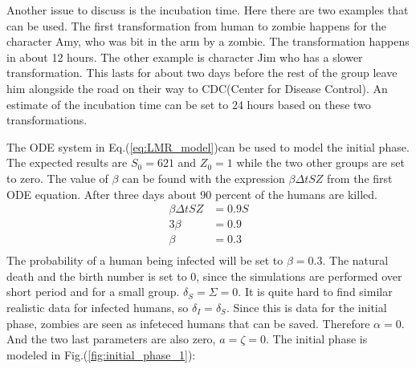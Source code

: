 \documentclass[%
twoside,                 %
final,                   %
chapterprefix=true,      %
open=right               %
10pt]{book}
\begin{document}
\vspace{3mm}




\vspace{3mm}


Another issue to discuss is the incubation time. Here there are two examples that can be used. The first transformation from human to zombie happens for the character Amy, who was bit in the arm by a zombie. The transformation happens in about 12 hours. The other example is character Jim who has a slower transformation. This lasts for about two days before the rest of the group leave him alongside the road on their way to CDC(Center for Disease Control). An estimate of the incubation time can be set to 24 hours based on these two transformations.


\vspace{3mm}




\vspace{3mm}


The ODE system in Eq.(\ref{eq:LMR_model})can be used to model the initial phase. The expected results are $S_0 = 621$ and $Z_0 = 1$ while the two other groups are set to zero. The value of $\beta$ can be found with the expression $\beta \Delta t S Z$ from the first ODE equation. After three days about 90 percent of the humans are killed.
\begin{equation}
	\begin{aligned}
	\beta\Delta t S Z &= 0.9 S\\
	3\beta   &= 0.9 \\
	\beta &= 0.3 \\
	\end{aligned}
\end{equation}
The probability of a human being infected will be set to $\beta = 0.3$. The natural death and the birth number is set to 0, since the simulations are performed over short period and for a small group. $\delta_S = \Sigma = 0$. It is quite hard to find similar realistic data for infected humans, so $\delta_I = \delta_S$. Since this is data for the initial phase, zombies are seen as infeteced humans that can be saved. Therefore $\alpha = 0$. And the two last parameters are also zero, $a = \zeta = 0$. The initial phase is modeled in Fig.(\ref{fig:initial_phase_1}):
\end{document}
